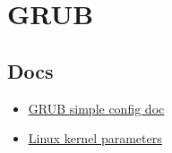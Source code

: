 \documentclass[10pt, a4paper, onecolumn, openany]{book} %
\begin{document}
\chapter{GRUB}
\section{Docs}
\begin{itemize}
    \item \underline{\href{https://www.gnu.org/software/grub/manual/grub/html_node/Simple-configuration.html}{GRUB simple config doc}}
    \item \underline{\href{https://github.com/torvalds/linux/blob/master/Documentation/admin-guide/kernel-parameters.txt}{Linux kernel parameters}}
\end{itemize}
\end{document}

